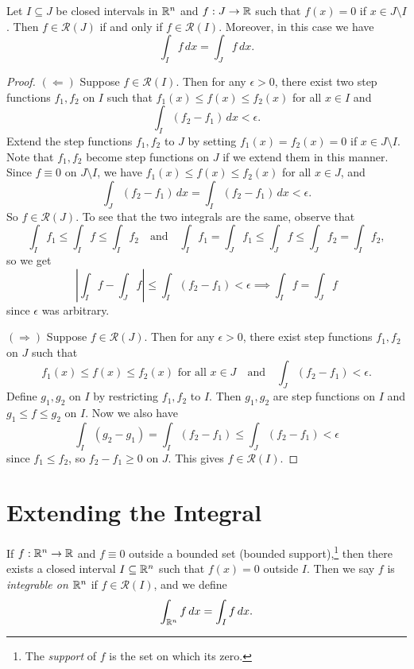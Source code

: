 \begin{corollary}
  Let $I \subseteq J$ be closed intervals in $\mathbb{R}^n$ and
  $f : J \to \mathbb{R}$ such that $f(x) = 0$ if
  $x \in J \setminus I$. Then $f \in \mathcal{R}(J)$
  if and only if $f \in \mathcal{R}(I)$. Moreover,
  in this case we have
  \[
    \int_{I} f\, dx = \int_{J} f\, dx.
  \]
\end{corollary}

\begin{proof}
  $(\Leftarrow)$ Suppose $f \in \mathcal{R}(I)$. Then for
  any $\epsilon > 0$,
  there exist two step functions $f_1, f_2$ on $I$ such
  that $f_1(x) \le f(x) \le f_2(x)$ for all $x \in I$ and
  \[
    \int_{I} (f_2 - f_1)\, dx < \epsilon.
  \]
  Extend the step functions $f_1, f_2$ to $J$ by setting
  $f_1(x) = f_2(x) = 0$ if $x \in J \setminus I$. Note
  that $f_1, f_2$ become step functions on $J$ if we
  extend them in this manner. Since $f \equiv 0$ on
  $J \setminus I$, we have
  $f_1(x) \le f(x) \le f_2(x)$ for all $x \in J$, and
  \[
    \int_J (f_2 - f_1)\, dx = \int_I (f_2 - f_1)\, dx < \epsilon.
  \]
  So $f \in \mathcal{R}(J)$. To see that the two integrals
  are the same, observe that
  \[
    \int_{I} f_1 \le \int_{I} f \le \int_{I} f_2
    \quad \text{and} \quad
    \int_I f_1 = \int_{J} f_1 \le \int_{J} f \le \int_{J} f_2 = \int_I f_2,
  \]
  so we get
  \[
  \left|\int_I f - \int_J f\right|
  \le \int_I (f_2 - f_1) < \epsilon \implies
    \int_I f = \int_J f
  \]
  since $\epsilon$ was arbitrary.

  $(\Rightarrow)$ Suppose $f \in \mathcal{R}(J)$. Then
  for any $\epsilon > 0$, there exist step functions
  $f_1, f_2$ on $J$ such that
  \[
    f_1(x) \le f(x) \le f_2(x) \text{ for all } x \in J \quad \text{and} \quad
    \int_{J} (f_2 - f_1) < \epsilon.
  \]
  Define $g_1, g_2$ on $I$ by restricting $f_1, f_2$ to $I$.
  Then $g_1, g_2$ are step functions on $I$ and
  $g_1 \le f \le g_2$ on $I$. Now we also have
  \[
    \int_I (g_2 - g_1) = \int_I (f_2 - f_1)
    \le \int_J (f_2 - f_1) < \epsilon
  \]
  since $f_1 \le f_2$, so $f_2 - f_1 \ge 0$ on $J$.
  This gives $f \in \mathcal{R}(I)$.
\end{proof}

\section{Extending the Integral}

\begin{definition}
If $f : \mathbb{R}^n \to \mathbb{R}$ and $f \equiv 0$ outside
a bounded set (bounded support),\footnote{The \emph{support} of $f$ is the set on which its zero.} then there exists a closed
interval $I \subseteq \mathbb{R}^n$ such that
$f(x) = 0$ outside $I$. Then we say $f$ is
\emph{integrable on $\mathbb{R}^n$} if $f \in \mathcal{R}(I)$, and
we define
\[
  \int_{\mathbb{R}^n} f\, dx = \int_{I} f\, dx.
\]
\end{definition}

